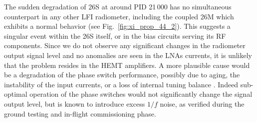 \documentclass{aa}
\begin{document}
The sudden degradation of 26S at around PID 21\,000 has no
simultaneous counterpart in any other LFI radiometer, including the
coupled 26M which exhibits a normal behavior (see
Fig.~\ref{fig:xi_prop_44_2}).  This suggests a singular event within the
26S itself, or in the bias circuits serving its RF components. Since
we do not observe any significant changes in the radiometer output signal
level and no anomalies are seen in the LNAs currents, it is unlikely
that the problem resides in the HEMT amplifiers. A more plausible
cause would be a degradation of the phase switch performance, possibly
due to aging, the instability of the input currents, or a loss of internal
tuning balance \citep{mennella2010,cuttaia2009}. Indeed sub-optimal
operation of the phase switches would not significantly change the
signal output level, but is known to introduce excess $1/f$ noise, as
verified during the ground testing and in-flight commissioning phase.
\end{document}
